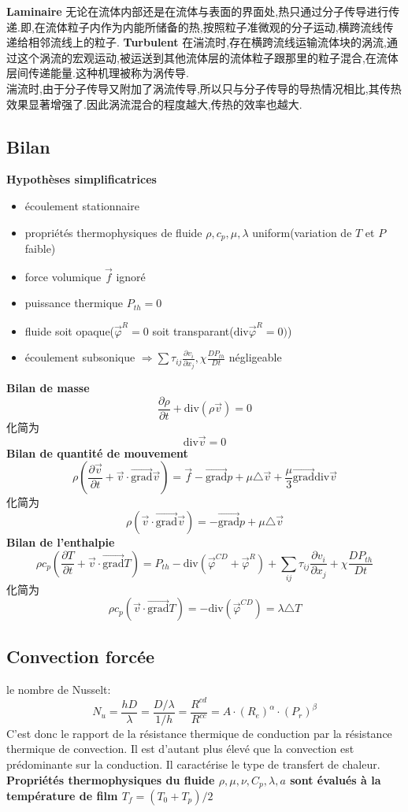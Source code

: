 \documentclass{article}
\begin{document}
\textbf{Laminaire}
无论在流体内部还是在流体与表面的界面处,热只通过分子传导进行传递.即,在流体粒子内作为内能所储备的热,按照粒子准微观的分子运动,横跨流线传递给相邻流线上的粒子.
\textbf{Turbulent}
在湍流时,存在横跨流线运输流体块的涡流,通过这个涡流的宏观运动,被运送到其他流体层的流体粒子跟那里的粒子混合,在流体层间传递能量.这种机理被称为涡传导.\\
湍流时,由于分子传导又附加了涡流传导,所以只与分子传导的导热情况相比,其传热效果显著增强了.因此涡流混合的程度越大,传热的效率也越大.

\subsection{Bilan}
\textbf{Hypoth\`eses simplificatrices}
\begin{itemize}
\item \'ecoulement stationnaire
\item propri\'et\'es thermophysiques de fluide $\rho, c_p, \mu,\lambda $ uniform(variation de $T$ et $P$ faible)
\item force volumique $\vec{f}$ ignor\'e
\item puissance thermique $P_{th}=0$
\item fluide soit opaque($\vec{\varphi}^R = 0$ soit transparant($\mbox{div} \vec{\varphi}^R=0)$)
\item \'ecoulement subsonique $\Rightarrow \sum \tau_{ij}\frac{\partial  v_i}{\partial x_j},\chi\frac{ DP_{th}}{Dt}$ n\'egligeable
\end{itemize}
\textbf{Bilan de masse}
$$\frac{\partial  \rho}{\partial t} + \mbox{div} (\rho \vec{v})=0 $$
化简为
$$\mbox{div} \vec{v}=0$$
\textbf{Bilan de quantit\'e de mouvement}
$$
\rho(\frac{\partial  \vec{v}}{\partial t}+ \vec{v}\cdot \vec{\mbox{grad}}\vec{v}) =  \vec{f} - \vec{\mbox{grad}} p + \mu \triangle\vec{v} + \frac{\mu}{3}\vec{\mbox{grad}} \mbox{div} \vec{v}
$$
化简为
$$
\rho(  \vec{v}\cdot \vec{\mbox{grad}}\vec{v}) =   - \vec{\mbox{grad}} p + \mu \triangle\vec{v}
$$
\textbf{Bilan de l'enthalpie}
$$
\rho c_p (\frac{\partial  T}{\partial t} + \vec{v}\cdot \vec{\mbox{grad}} T)=P_{th} - \mbox{div} (\vec{\varphi}^{CD}+\vec{\varphi}^R) +  \sum_{ij} \tau_{ij}\frac{\partial  v_i}{\partial x_j} + \chi\frac{ DP_{th}}{Dt}
$$
化简为
$$
\rho c_p ( \vec{v}\cdot \vec{\mbox{grad}} T)=- \mbox{div} (\vec{\varphi}^{CD}) =\lambda \triangle T
$$

\subsection{Convection forc\'ee}
le nombre de Nusselt:$$N_u = \frac{hD}{\lambda }=\frac{D/\lambda }{1/h}=\frac{R^{cd}}{R^{cc}}=A\cdot (R_e)^{\alpha}\cdot (P_r)^{\beta}$$
C'est donc le rapport de la r\'esistance thermique de conduction par la r\'esistance thermique de convection. Il est d'autant plus \'elev\'e que la convection est pr\'edominante sur la conduction. Il caract\'erise le type de transfert
de chaleur.\\
\textbf{Propri\'et\'es thermophysiques du fluide $\rho, \mu, \nu, C_p, \lambda, a$ sont \'evalu\'es \`a la temp\'erature de film $T_f = (T_0 + T_p)/2$}
\end{document}
